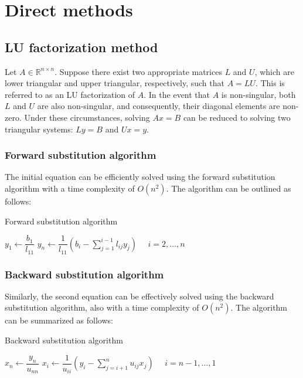 \section{Direct methods}

\subsection*{LU factorization method}
Let $A \in \mathbb{R}^{n \times n}$. 
Suppose there exist two appropriate matrices $L$ and $U$, which are lower triangular and upper triangular, respectively, such that $A=LU$. 
This is referred to as an LU factorization of $A$.
In the event that $A$ is non-singular, both $L$ and $U$ are also non-singular, and consequently, their diagonal elements are non-zero.
Under these circumstances, solving $Ax=B$ can be reduced to solving two triangular systems: $Ly=B$ and $Ux=y$. 
\subsubsection*{Forward substitution algorithm}
The initial equation can be efficiently solved using the forward substitution algorithm with a time complexity of $O(n^2)$. 
The algorithm can be outlined as follows:
\begin{algorithm}[H]
    \caption{Forward substitution algorithm}
        \begin{algorithmic}
            \State $y_1\leftarrow\dfrac{b_1}{l_{11}}$
            \State $y_n\leftarrow\dfrac{1}{l_{11}}\left( b_i-\sum_{j=1}^{i-1}{l_{ij}y_j} \right) \:\:\:\:\:\: i=2,\dots,n$
        \end{algorithmic}
\end{algorithm}
\subsubsection*{Backward substitution algorithm}
Similarly, the second equation can be effectively solved using the backward substitution algorithm, also with a time complexity of $O(n^2)$. 
The algorithm can be summarized as follows:
\begin{algorithm}[H]
    \caption{Backward substitution algorithm}
        \begin{algorithmic}
            \State $x_n\leftarrow\dfrac{y_n}{u_{nn}}$
            \State $x_i\leftarrow\dfrac{1}{u_{ii}} \left( y_i-\sum_{j=i+1}^{n}{u_{ij}x_j} \right) \:\:\:\:\:\: i=n-1,\dots,1$
        \end{algorithmic}
\end{algorithm}

